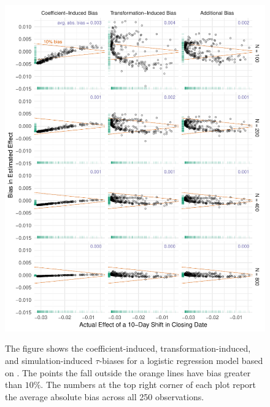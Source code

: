 \documentclass[11pt]{article}
\begin{document}
\begin{figure}[h!]
\begin{center}
\includegraphics[scale = 0.75]{figs/nagler-fd-bias.pdf}\\
\vspace{.1in}
\caption{The figure shows the coefficient-induced, transformation-induced, and simulation-induced $\tau$-biases for a logistic regression model based on \cite{BerryDeMerittEsarey2010}.
The points the fall outside the orange lines have bias greater than $10\%$.
The numbers at the top right corner of each plot report the average absolute bias across all 250 observations.}\label{fig:nagler}
\end{center}
\end{figure}
\end{document}
